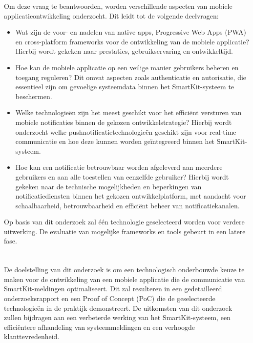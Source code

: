 \noindent Om deze vraag te beantwoorden, worden verschillende aspecten van mobiele applicatieontwikkeling onderzocht. Dit leidt tot de volgende deelvragen:

\begin{itemize}
    \item Wat zijn de voor- en nadelen van native apps, Progressive Web Apps (PWA) en cross-platform frameworks voor de ontwikkeling van de mobiele applicatie? Hierbij wordt gekeken naar prestaties, gebruikservaring en ontwikkeltijd.
    
    \item Hoe kan de mobiele applicatie op een veilige manier gebruikers beheren en toegang reguleren? Dit omvat aspecten zoals authenticatie en autorisatie, die essentieel zijn om gevoelige systeemdata binnen het SmartKit-systeem te beschermen.
    
    \item Welke technologieën zijn het meest geschikt voor het efficiënt versturen van mobiele notificaties binnen de gekozen ontwikkelstrategie? Hierbij wordt onderzocht welke pushnotificatietechnologieën geschikt zijn voor real-time communicatie en hoe deze kunnen worden geïntegreerd binnen het SmartKit-systeem.
    
    \item Hoe kan een notificatie betrouwbaar worden afgeleverd aan meerdere gebruikers en aan alle toestellen van eenzelfde gebruiker? Hierbij wordt gekeken naar de technische mogelijkheden en beperkingen van notificatiediensten binnen het gekozen ontwikkelplatform, met aandacht voor schaalbaarheid, betrouwbaarheid en efficiënt beheer van notificatiekanalen.
\end{itemize}

\noindent
Op basis van dit onderzoek zal één technologie geselecteerd worden voor verdere uitwerking. De evaluatie van mogelijke frameworks en tools gebeurt in een latere fase.


\section{}%
\label{sec:onderzoeksdoelstelling}

\noindent De doelstelling van dit onderzoek is om een technologisch onderbouwde keuze te maken voor de ontwikkeling van een mobiele applicatie die de communicatie van SmartKit-meldingen optimaliseert. Dit zal resulteren in een gedetailleerd onderzoeksrapport en een Proof of Concept (PoC) die de geselecteerde technologieën in de praktijk demonstreert. De uitkomsten van dit onderzoek zullen bijdragen aan een verbeterde werking van het SmartKit-systeem, een efficiëntere afhandeling van systeemmeldingen en een verhoogde klanttevredenheid. \\

